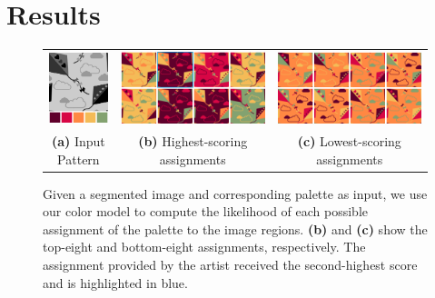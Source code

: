 \section{Results}
\label{sec:results}

\begin{figure}[ht]
\begin{tabular}{ccc}
\includegraphics[width=.15\linewidth]{figs/permutationTemplatePalette} & \includegraphics[width=.4\linewidth]{figs/permutationBest8} & \includegraphics[width=.4\linewidth]{figs/permutationWorst8} %
  \\
\textbf{(a)} Input Pattern & \textbf{(b)} Highest-scoring assignments & \textbf{(c)} Lowest-scoring assignments %
\\
\end{tabular}

\caption{Given a segmented image and corresponding palette as input, we use our color model to compute the likelihood of each possible assignment of the palette to the image regions. \textbf{(b)} and \textbf{(c)} show the top-eight and bottom-eight assignments, respectively. The assignment provided by the artist received the second-highest score and is highlighted in blue.}
\label{fig:permutation}
\vspace{-1.0em}
\end{figure}

